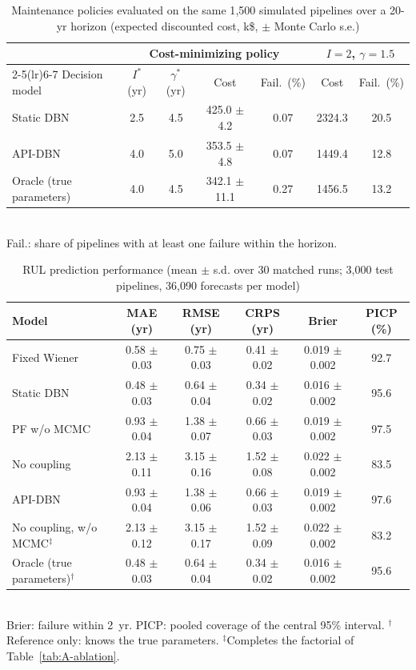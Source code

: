 \begin{table}[!t]
\centering
\caption{Maintenance policies evaluated on the same 1{,}500 simulated pipelines over a 20-yr horizon (expected discounted cost, k\$, $\pm$ Monte Carlo s.e.)}
\label{tab:maint}
\setlength{\tabcolsep}{3pt}
\begin{tabular}{lcccccc}
\toprule
 & \multicolumn{4}{c}{Cost-minimizing policy} & \multicolumn{2}{c}{$I=2$, $\gamma=1.5$} \\
\cmidrule(lr){2-5}\cmidrule(lr){6-7}
Decision model & $I^*$ (yr) & $\gamma^*$ (yr) & Cost & Fail.\ (\%) & Cost & Fail.\ (\%) \\
\midrule
Static DBN & 2.5 & 4.5 & 425.0 $\pm$ 4.2 & 0.07 & 2324.3 & 20.5 \\
API-DBN & 4.0 & 5.0 & 353.5 $\pm$ 4.8 & 0.07 & 1449.4 & 12.8 \\
Oracle (true parameters) & 4.0 & 4.5 & 342.1 $\pm$ 11.1 & 0.27 & 1456.5 & 13.2 \\
\bottomrule
\end{tabular}
\\[2pt]\footnotesize{Fail.: share of pipelines with at least one failure within the horizon.}
\end{table}

\begin{table}[!t]
\centering
\caption{RUL prediction performance (mean $\pm$ s.d. over 30 matched runs; 3{,}000 test pipelines, 36{,}090 forecasts per model)}
\label{tab:A-rul}
\setlength{\tabcolsep}{3pt}
\begin{tabular}{lccccc}
\toprule
Model & MAE (yr) & RMSE (yr) & CRPS (yr) & Brier & PICP (\%) \\
\midrule
Fixed Wiener & 0.58 $\pm$ 0.03 & 0.75 $\pm$ 0.03 & 0.41 $\pm$ 0.02 & 0.019 $\pm$ 0.002 & 92.7 \\
Static DBN & 0.48 $\pm$ 0.03 & 0.64 $\pm$ 0.04 & 0.34 $\pm$ 0.02 & 0.016 $\pm$ 0.002 & 95.6 \\
PF w/o MCMC & 0.93 $\pm$ 0.04 & 1.38 $\pm$ 0.07 & 0.66 $\pm$ 0.03 & 0.019 $\pm$ 0.002 & 97.5 \\
No coupling & 2.13 $\pm$ 0.11 & 3.15 $\pm$ 0.16 & 1.52 $\pm$ 0.08 & 0.022 $\pm$ 0.002 & 83.5 \\
API-DBN & 0.93 $\pm$ 0.04 & 1.38 $\pm$ 0.06 & 0.66 $\pm$ 0.03 & 0.019 $\pm$ 0.002 & 97.6 \\
\midrule
No coupling, w/o MCMC$^\ddagger$ & 2.13 $\pm$ 0.12 & 3.15 $\pm$ 0.17 & 1.52 $\pm$ 0.09 & 0.022 $\pm$ 0.002 & 83.2 \\
Oracle (true parameters)$^\dagger$ & 0.48 $\pm$ 0.03 & 0.64 $\pm$ 0.04 & 0.34 $\pm$ 0.02 & 0.016 $\pm$ 0.002 & 95.6 \\
\bottomrule
\end{tabular}
\\[2pt]\footnotesize{Brier: failure within 2~yr. PICP: pooled coverage of the central 95\% interval.
$^\dagger$Reference only: knows the true parameters.
 $^\ddagger$Completes the factorial of Table~\ref{tab:A-ablation}.}
\end{table}

